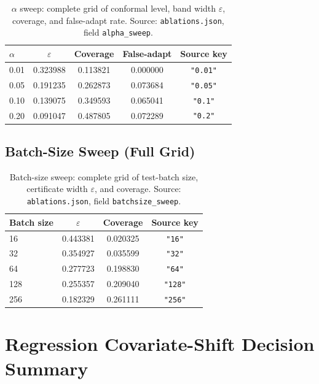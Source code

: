 \begin{table}[ht]
\centering
\caption{$\alpha$ sweep: complete grid of conformal level, band width $\varepsilon$,
  coverage, and false-adapt rate.  Source: \texttt{ablations.json},
  field \texttt{alpha\_sweep}.}
\label{tab:full-alpha}
\begin{tabular}{lcccc}
\toprule
$\alpha$ & $\varepsilon$ & Coverage & False-adapt & Source key \\
\midrule
0.01 & 0.323988 & 0.113821 & 0.000000 & \texttt{"0.01"} \\
0.05 & 0.191235 & 0.262873 & 0.073684 & \texttt{"0.05"} \\
0.10 & 0.139075 & 0.349593 & 0.065041 & \texttt{"0.1"} \\
0.20 & 0.091047 & 0.487805 & 0.072289 & \texttt{"0.2"} \\
\bottomrule
\end{tabular}
\end{table}

\subsection{Batch-Size Sweep (Full Grid)}

\begin{table}[ht]
\centering
\caption{Batch-size sweep: complete grid of test-batch size, certificate width
  $\varepsilon$, and coverage.  Source: \texttt{ablations.json},
  field \texttt{batchsize\_sweep}.}
\label{tab:full-batch}
\begin{tabular}{lccc}
\toprule
Batch size & $\varepsilon$ & Coverage & Source key \\
\midrule
16  & 0.443381 & 0.020325 & \texttt{"16"} \\
32  & 0.354927 & 0.035599 & \texttt{"32"} \\
64  & 0.277723 & 0.198830 & \texttt{"64"} \\
128 & 0.255357 & 0.209040 & \texttt{"128"} \\
256 & 0.182329 & 0.261111 & \texttt{"256"} \\
\bottomrule
\end{tabular}
\end{table}

\section{Regression Covariate-Shift Decision Summary}
\label{sec:app-regression}

